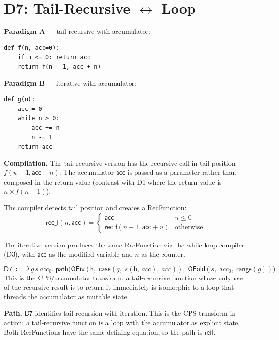 \section{D7: Tail-Recursive $\leftrightarrow$ Loop}
\label{sec:d7}

\textbf{Paradigm A} --- tail-recursive with accumulator:
\begin{lstlisting}
def f(n, acc=0):
    if n <= 0: return acc
    return f(n - 1, acc + n)
\end{lstlisting}

\textbf{Paradigm B} --- iterative with accumulator:
\begin{lstlisting}
def g(n):
    acc = 0
    while n > 0:
        acc += n
        n -= 1
    return acc
\end{lstlisting}

\textbf{Compilation.}
The tail-recursive version has the recursive call in tail position:
$f(n-1, \mathsf{acc} + n)$.  The accumulator $\mathsf{acc}$ is
passed as a parameter rather than composed in the return value
(contrast with D1 where the return value is $n \times f(n-1)$).

The compiler detects tail position and creates a RecFunction:
\[
  \mathsf{rec\_f}(n, \mathsf{acc}) = \begin{cases}
    \mathsf{acc} & n \leq 0 \\
    \mathsf{rec\_f}(n-1, \mathsf{acc} + n) & \text{otherwise}
  \end{cases}
\]

The iterative version produces the same RecFunction via the while
loop compiler (D3), with $\mathsf{acc}$ as the modified variable and
$n$ as the counter.

\begin{definition}
\label{def:d7-path}
\[
  \mathsf{D7} \;\coloneqq\; \lambda\, g\, s\, \mathit{acc}_0.\;
  \mathsf{path}\!\big(
    \mathsf{OFix}(\mathsf{h},\;
      \mathsf{case}(g,\; s(\mathsf{h},\, \mathit{acc}),\;
        \mathit{acc})),\;
    \mathsf{OFold}(s,\; \mathit{acc}_0,\; \mathsf{range}(g))
  \big)
\]
This is the CPS/accumulator transform: a tail-recursive function
whose only use of the recursive result is to return it immediately
is isomorphic to a loop that threads the accumulator as mutable
state.
\end{definition}

\textbf{Path.}
$\mathsf{D7}$ identifies tail recursion with iteration.  This is the
CPS transform in action: a tail-recursive function is a loop with
the accumulator as explicit state.  Both RecFunctions have the same
defining equation, so the path is $\mathsf{refl}$.

